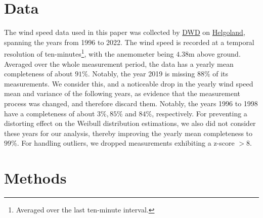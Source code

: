 \documentclass{article}
\theoremstyle{plain}
\theoremstyle{definition}
\theoremstyle{remark}
\begin{document}
\fi


\section{Data}\label{sec:data}

The wind speed data used in this paper was collected by \href{https://www.dwd.de}{DWD} on \href{https://www.openstreetmap.org/?mlat=54.1750&mlon=7.8920#map=15/54.1750/7.8920}{Helgoland}, spanning the years from 1996 to 2022. The wind speed is recorded at a temporal resolution of ten-minutes\footnote{Averaged over the last ten-minute interval.}, with the anemometer being $4.38 \mathrm{m}$ above ground. Averaged over the whole measurement period, the data has a yearly mean completeness of about $91\%$. Notably, the year 2019 is missing $88\%$ of its measurements. We consider this, and a noticeable drop in the yearly wind speed mean and variance of the following years, as evidence that the measurement process was changed, and therefore discard them. Notably, the years 1996 to 1998 have a completeness of about $3\%, 85\%$ and $84\%$, respectively. For preventing a distorting effect on the Weibull distribution estimations, we also did not consider these years for our analysis, thereby improving the yearly mean completeness to $99\%$. For handling outliers, we dropped measurements exhibiting a z-score $> 8$.

\section{Methods}\label{sec:methods}
\end{document}
